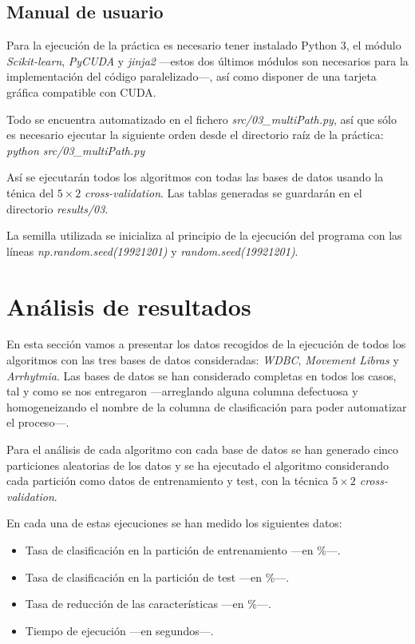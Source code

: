 \documentclass[a4paper, 11pt, titlepage]{article}
\begin{document}
    \subsection{Manual de usuario}
    Para la ejecución de la práctica es necesario tener instalado Python 3, el módulo \emph{Scikit-learn}, \emph{PyCUDA} y \emph{jinja2} ---estos dos últimos módulos son necesarios para la implementación del código paralelizado---, así como disponer de una tarjeta gráfica compatible con CUDA.

    Todo se encuentra automatizado en el fichero \emph{src/03\_multiPath.py}, así que sólo es necesario ejecutar la siguiente orden desde el directorio raíz de la práctica: \emph{python src/03\_multiPath.py}

    Así se ejecutarán todos los algoritmos con todas las bases de datos usando la ténica del  $5\times2$ \emph{cross-validation}. Las tablas generadas se guardarán en el directorio \emph{results/03}.

    La semilla utilizada se inicializa al principio de la ejecución del programa con las líneas \emph{np.random.seed(19921201)} y \emph{random.seed(19921201)}.


    \section{Análisis de resultados}

    En esta sección vamos a presentar los datos recogidos de la ejecución de todos los algoritmos con las tres bases de datos consideradas: \emph{WDBC}, \emph{Movement Libras} y \emph{Arrhytmia}. Las bases de datos se han considerado completas en todos los casos, tal y como se nos entregaron ---arreglando alguna columna defectuosa y homogeneizando el nombre de la columna de clasificación para poder automatizar el proceso---.

    Para el análisis de cada algoritmo con cada base de datos se han generado cinco particiones aleatorias de los datos y se ha ejecutado el algoritmo considerando cada partición como datos de entrenamiento y test, con la técnica \emph{$5\times2$ cross-validation}.

    En cada una de estas ejecuciones se han medido los siguientes datos:
    \begin{itemize}
        \item Tasa de clasificación en la partición de entrenamiento ---en \%---.
        \item Tasa de clasificación en la partición de test ---en \%---.
        \item Tasa de reducción de las características ---en \%---.
        \item Tiempo de ejecución ---en segundos---.
    \end{itemize}
\end{document}

